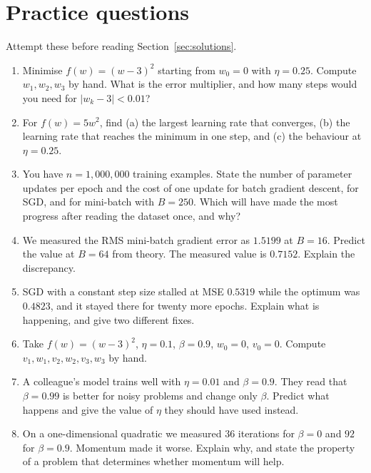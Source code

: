 \documentclass[11pt]{article}
\begin{document}
\newpage
\section{Practice questions}

Attempt these before reading Section~\ref{sec:solutions}.

\begin{enumerate}[leftmargin=*]
  \item Minimise $f(w) = (w-3)^2$ starting from $w_0 = 0$ with $\eta = 0.25$.
    Compute $w_1, w_2, w_3$ by hand. What is the error multiplier, and how many
    steps would you need for $\lvert w_k - 3\rvert < 0.01$?

  \item\label{q:stab} For $f(w) = 5w^2$, find (a) the largest learning rate
    that converges, (b) the learning rate that reaches the minimum in one step,
    and (c) the behaviour at $\eta = 0.25$.

  \item You have $n = 1{,}000{,}000$ training examples. State the number of
    parameter updates per epoch and the cost of one update for batch gradient
    descent, for SGD, and for mini-batch with $B = 250$. Which will have made
    the most progress after reading the dataset once, and why?

  \item We measured the RMS mini-batch gradient error as $1.5199$ at $B = 16$.
    Predict the value at $B = 64$ from theory. The measured value is $0.7152$.
    Explain the discrepancy.

  \item SGD with a constant step size stalled at MSE $0.5319$ while the optimum
    was $0.4823$, and it stayed there for twenty more epochs. Explain what is
    happening, and give two different fixes.

  \item Take $f(w) = (w-3)^2$, $\eta = 0.1$, $\beta = 0.9$, $w_0 = 0$,
    $v_0 = 0$. Compute $v_1, w_1, v_2, w_2, v_3, w_3$ by hand.

  \item A colleague's model trains well with $\eta = 0.01$ and $\beta = 0.9$.
    They read that $\beta = 0.99$ is better for noisy problems and change only
    $\beta$. Predict what happens and give the value of $\eta$ they should have
    used instead.

  \item On a one-dimensional quadratic we measured $36$ iterations for
    $\beta = 0$ and $92$ for $\beta = 0.9$. Momentum made it worse. Explain
    why, and state the property of a problem that determines whether momentum
    will help.


\end{enumerate}
\end{document}
